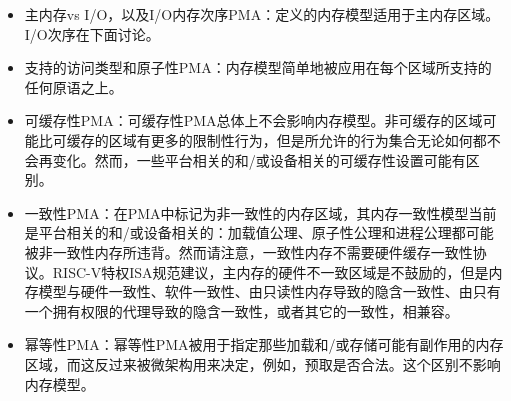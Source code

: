 \begin{itemize}
  \item 主内存vs I/O，以及I/O内存次序PMA：定义的内存模型适用于主内存区域。I/O次序在下面讨论。
  \item 支持的访问类型和原子性PMA：内存模型简单地被应用在每个区域所支持的任何原语之上。
  \item 可缓存性PMA：可缓存性PMA总体上不会影响内存模型。非可缓存的区域可能比可缓存的区域有更多的限制性行为，但是所允许的行为集合无论如何都不会再变化。然而，一些平台相关的和/或设备相关的可缓存性设置可能有区别。
  \item 一致性PMA：在PMA中标记为非一致性的内存区域，其内存一致性模型当前是平台相关的和/或设备相关的：加载值公理、原子性公理和进程公理都可能被非一致性内存所违背。然而请注意，一致性内存不需要硬件缓存一致性协议。RISC-V特权ISA规范建议，主内存的硬件不一致区域是不鼓励的，但是内存模型与硬件一致性、软件一致性、由只读性内存导致的隐含一致性、由只有一个拥有权限的代理导致的隐含一致性，或者其它的一致性，相兼容。
  \item 幂等性PMA：幂等性PMA被用于指定那些加载和/或存储可能有副作用的内存区域，而这反过来被微架构用来决定，例如，预取是否合法。这个区别不影响内存模型。
\end{itemize}

